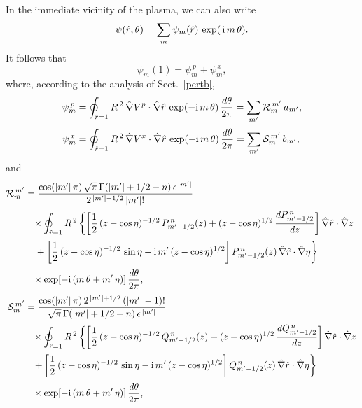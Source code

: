\documentclass[12pt,prb,aps]{revtex4-1}
\begin{document}
In the immediate vicinity of the plasma, we can also write
\begin{equation}
\psi(\hat{r},\theta) = \sum_m \psi_m(\hat{r})\,\exp(\,{\rm i}\,m\,\theta).
\end{equation}
It follows that
\begin{equation}\label{e351}
\psi_m(1) = \psi_m^{\,p} + \psi_m^{\,x},
\end{equation}
where, according to the analysis of Sect.~\ref{pertb}, 
\begin{align}\label{e352}
\psi_m^{\,p} &= \oint_{\hat{r}=1}R^{\,2}\,\hat{\nabla}V^p\cdot \hat{\nabla}\hat{r}\,\exp(-{\rm i}\,m\,\theta)\,\frac{d\theta}{2\pi}= \sum_{m'}{\cal R}_m^{\,m'}\,a_{m'},\\[0.5ex]
\psi_m^{\,x} &= \oint_{\hat{r}=1}R^{\,2}\,\hat{\nabla}V^x\cdot\hat{\nabla}\hat{r}\,\exp(-{\rm i}\,m\,\theta)\,\frac{d\theta}{2\pi}= \sum_{m'}{\cal S}_m^{\,m'}\,b_{m'},
\label{e353}
\end{align}
and
\begin{align}\label{e354}
{\cal R}_m^{\,m'} &=
\frac{\cos(|m'|\,\pi)\,\sqrt{\pi}\,\Gamma(|m'|+1/2-n)\,\epsilon^{\,|m'|}}{2^{\,|m'|-1/2}\,|m'|!}
\nonumber\\[0.5ex]&\phantom{=}\times \oint_{\hat{r}=1}
R^{\,2}\left\{\left[\frac{1}{2}\,(z-\cos\eta)^{-1/2}\,P_{m'-1/2}^{\,n}(z)+(z-\cos\eta)^{1/2}\,\frac{dP_{m'-1/2}^{\,n}}{dz}\right]\hat{\nabla}\hat{r}\cdot\hat{\nabla} z
\right.\nonumber\\[0.5ex]&
\left.\phantom{=}+\left[\frac{1}{2}\,(z-\cos\eta)^{-1/2}\,\sin\eta-{\rm i}\,m'\,(z-\cos\eta)^{1/2}\right]P_{m'-1/2}^{\,n}(z)\,\hat{\nabla}\hat{r}\cdot\hat{\nabla} \eta
\right\}\nonumber\\[0.5ex] &
\phantom{=}\times\exp[-{\rm i}\,(m\,\theta+m'\,\eta)]\,\frac{d\theta}{2\pi},\\[0.5ex]
{\cal S}_m^{\,m'} &=\frac{\cos(|m'|\,\pi)\,2^{\,|m'|+1/2}\,(|m'|-1)!}{\sqrt{\pi}\,\Gamma(|m'|+1/2+n)\,\epsilon^{\,|m'|}}
\nonumber\\[0.5ex]&\phantom{=}\times \oint_{\hat{r}=1}
R^{\,2}\left\{\left[\frac{1}{2}\,(z-\cos\eta)^{-1/2}\,Q_{m'-1/2}^{\,n}(z)+(z-\cos\eta)^{1/2}\,\frac{dQ_{m'-1/2}^{\,n}}{dz}\right]\hat{\nabla}\hat{r}\cdot\hat{\nabla} z
\right.\nonumber\\[0.5ex]&
\phantom{=}\left.+\left[\frac{1}{2}\,(z-\cos\eta)^{-1/2}\,\sin\eta-{\rm i}\,m'\,(z-\cos\eta)^{1/2}\right]Q_{m'-1/2}^{\,n}(z)\,\hat{\nabla}\hat{r}\cdot\hat{\nabla} \eta
\right\}\nonumber\\[0.5ex] &
\phantom{=}\times\exp[-{\rm i}\,(m\,\theta+m'\,\eta)]\,\frac{d\theta}{2\pi},
\end{align}
\end{document}
